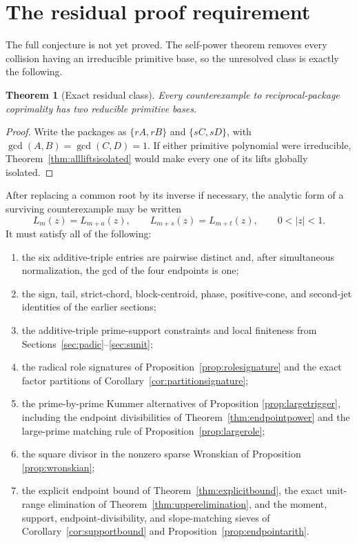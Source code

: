 \documentclass[11pt]{article}
\newtheorem{theorem}{Theorem}[section]
\theoremstyle{definition}
\begin{document}
\section{The residual proof requirement}
\label{sec:residual}

The full conjecture is not yet proved.  The self-power theorem removes every
collision having an irreducible primitive base, so the unresolved class is
exactly the following.

\begin{theorem}[Exact residual class]\label{thm:residualclass}
Every counterexample to reciprocal-package coprimality has two reducible
primitive bases.
\end{theorem}

\begin{proof}
Write the packages as \(\{rA,rB\}\) and \(\{sC,sD\}\), with
\(\gcd(A,B)=\gcd(C,D)=1\).  If either primitive polynomial were
irreducible, Theorem~\ref{thm:allliftsisolated} would make every one of its
lifts globally isolated.
\end{proof}

After replacing a common root by its inverse if necessary, the analytic form
of a surviving counterexample may be written
\begin{equation}
 L_m(z)=L_{m+a}(z),\qquad
 L_{m+s}(z)=L_{m+t}(z),\qquad 0<|z|<1.
 \tag{19.1}
\end{equation}
It must satisfy all of the following:
\begin{enumerate}[label=(\roman*)]
\item the six additive-triple entries are pairwise distinct and, after
simultaneous normalization, the gcd of the four endpoints is one;
\item the sign, tail, strict-chord, block-centroid, phase, positive-cone, and
second-jet identities of the earlier sections;
\item the additive-triple prime-support constraints and local finiteness from
Sections~\ref{sec:padic}--\ref{sec:sunit};
\item the radical role signatures of Proposition~\ref{prop:rolesignature}
and the exact factor partitions of Corollary~\ref{cor:partitionsignature};
\item the prime-by-prime Kummer alternatives of Proposition
\ref{prop:largetrigger}, including the endpoint divisibilities of
Theorem~\ref{thm:endpointpower} and the large-prime matching rule of
Proposition~\ref{prop:largerole};
\item the square divisor in the nonzero sparse Wronskian of Proposition
\ref{prop:wronskian};
\item the explicit endpoint bound of Theorem~\ref{thm:explicitbound},
the exact unit-range elimination of Theorem~\ref{thm:upperelimination}, and
the moment, support, endpoint-divisibility, and slope-matching sieves of
Corollary~\ref{cor:supportbound} and Proposition~\ref{prop:endpointarith}.
\end{enumerate}
\end{document}
